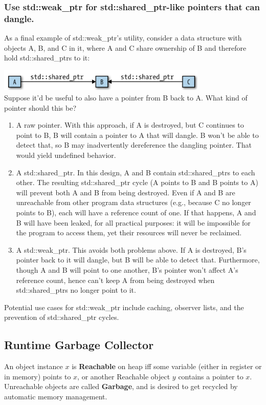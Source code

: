 \documentclass[a4paper]{exam}
\theoremstyle{definition}
\begin{document}
\subsubsection{Use std::weak\_ptr for std::shared\_ptr-like pointers that can dangle.}

As a final example of std::weak\_ptr’s utility, consider a data structure with objects A, B, and C in it, where A and C share ownership of B and therefore hold std::shared\_ptrs to it:

\includegraphics[width=10cm]{img/weak_ptr.png}\\
Suppose it’d be useful to also have a pointer from B back to A. What kind of pointer should this be?
\begin{enumerate}
  \item A raw pointer. With this approach, if A is destroyed, but C continues to point to B, B will contain a pointer to A that will dangle. B won’t be able to detect that, so B may inadvertently dereference the dangling pointer. That would yield undefined behavior.

  \item A std::shared\_ptr. In this design, A and B contain std::shared\_ptrs to each other. The resulting std::shared\_ptr cycle (A points to B and B points to A) will prevent both A and B from being destroyed. Even if A and B are unreachable from other program data structures (e.g., because C no longer points to B), each will have a reference count of one. If that happens, A and B will have been leaked, for all practical purposes: it will be impossible for the program to access them, yet their resources will never be reclaimed.
  
  \item A std::weak\_ptr. This avoids both problems above. If A is destroyed, B’s pointer back to it will dangle, but B will be able to detect that. Furthermore, though A and B will point to one another, B’s pointer won’t affect A’s reference count, hence can’t keep A from being destroyed when std::shared\_ptrs no longer point to it.
\end{enumerate}
Potential use cases for std::weak\_ptr include caching, observer lists, and the prevention of std::shared\_ptr cycles.
\subsection{Runtime Garbage Collector}
An object instance $x$ is \textbf{Reachable} on heap iff some variable (either in register or in memory) points to $x$, or another Reachable object $y$ contains a pointer to $x$. Unreachable objects are called \textbf{Garbage}, and is desired to get recycled by automatic memory management.
\end{document}
